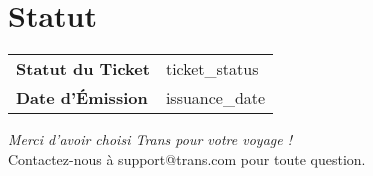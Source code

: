 \documentclass[a4paper,12pt]{article}
\begin{document}
\section*{Statut}
\begin{tabular}{ll}
    \textbf{Statut du Ticket} & ticket_status \\
    \textbf{Date d'Émission} & issuance_date \\
\end{tabular}

\vspace{1cm}
\begin{center}
    \textit{Merci d'avoir choisi Trans pour votre voyage !} \\
    \small{Contactez-nous à support@trans.com pour toute question.}
\end{center}

\end{document}
